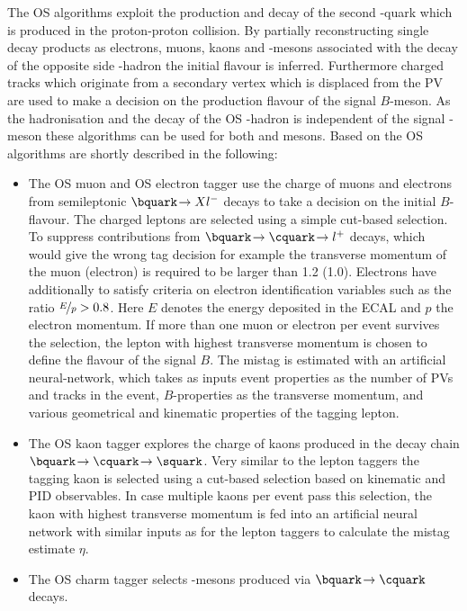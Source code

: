The OS algorithms exploit the production and decay of the second \bquark-quark which is produced in the proton-proton collision.
By partially reconstructing single decay products as electrons, muons, kaons and \D-mesons associated with the decay of the opposite side \bquark-hadron the initial flavour is inferred.
Furthermore charged tracks which originate from a secondary vertex which is displaced from the \ac{PV} are used to make a decision on the production flavour of the signal $B$-meson.
As the hadronisation and the decay of the OS \bquark-hadron is independent of the signal \B-meson these algorithms can be used for both \Bz and \Bs mesons. Based on \cite{LHCb-PAPER-2011-027, LHCb-PAPER-2015-027} the OS algorithms are shortly described in the following:
\begin{itemize}
	\item The OS muon and OS electron tagger use the charge of muons and electrons from semileptonic $\bquark\!\to Xl^-$ decays to take a decision on the initial $B$-flavour.
	The charged leptons are selected using a simple cut-based selection.
	To suppress contributions from $\bquark\!\to\cquark\!\to l^+$ decays, which would give the wrong tag decision for example the transverse momentum of the muon (electron) is required to be larger than \SI[per-mode=symbol]{1.2}{\GeVc} (\SI[per-mode=symbol]{1.0}{\GeVc}).
	Electrons have additionally to satisfy criteria on electron identification variables such as the ratio $\nicefrac{E}{p}>0.8$.
	Here $E$ denotes the energy deposited in the ECAL and $p$ the electron momentum.
	If more than one muon or electron per event survives the selection, the lepton with highest transverse momentum is chosen to define the flavour of the signal $B$.
	The mistag is estimated with an artificial neural-network, which takes as inputs event properties as the number of \ac{PV}s and tracks in the event, $B$-properties as the transverse momentum, and various geometrical and kinematic properties of the tagging lepton.
	\item The OS kaon tagger explores the charge of kaons produced in the decay chain $\bquark\!\to\cquark\!\to\squark$.
	Very similar to the lepton taggers the tagging kaon is selected using a cut-based selection based on kinematic and PID observables.
	In case multiple kaons per event pass this selection, the kaon with highest transverse momentum is fed into an artificial neural network with similar inputs as for the lepton taggers to calculate the mistag estimate $\eta$.
	\item The OS charm tagger selects \D-mesons produced via $\bquark\!\to\cquark$ decays.

\end{itemize}
